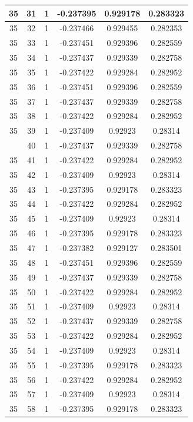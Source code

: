 \documentclass[12pt,a4paper]{article}
\numberwithin{equation}{section}
\numberwithin{figure}{section}
\numberwithin{table}{section}
\begin{document}
\begin{longtable}{|c|c|c|c|c|c|}
35 & 31 & 1 & -0.237395 & 0.929178 & 0.283323 \\ \hline
35 & 32 & 1 & -0.237466 & 0.929455 & 0.282353 \\ \hline
35 & 33 & 1 & -0.237451 & 0.929396 & 0.282559 \\ \hline
35 & 34 & 1 & -0.237437 & 0.929339 & 0.282758 \\ \hline
35 & 35 & 1 & -0.237422 & 0.929284 & 0.282952 \\ \hline
35 & 36 & 1 & -0.237451 & 0.929396 & 0.282559 \\ \hline
35 & 37 & 1 & -0.237437 & 0.929339 & 0.282758 \\ \hline
35 & 38 & 1 & -0.237422 & 0.929284 & 0.282952 \\ \hline
35 & 39 & 1 & -0.237409 & 0.92923 & 0.28314 \\ \hline
\pagebreak
35 & 40 & 1 & -0.237437 & 0.929339 & 0.282758 \\ \hline
35 & 41 & 1 & -0.237422 & 0.929284 & 0.282952 \\ \hline
35 & 42 & 1 & -0.237409 & 0.92923 & 0.28314 \\ \hline
35 & 43 & 1 & -0.237395 & 0.929178 & 0.283323 \\ \hline
35 & 44 & 1 & -0.237422 & 0.929284 & 0.282952 \\ \hline
35 & 45 & 1 & -0.237409 & 0.92923 & 0.28314 \\ \hline
35 & 46 & 1 & -0.237395 & 0.929178 & 0.283323 \\ \hline
35 & 47 & 1 & -0.237382 & 0.929127 & 0.283501 \\ \hline
35 & 48 & 1 & -0.237451 & 0.929396 & 0.282559 \\ \hline
35 & 49 & 1 & -0.237437 & 0.929339 & 0.282758 \\ \hline
35 & 50 & 1 & -0.237422 & 0.929284 & 0.282952 \\ \hline
35 & 51 & 1 & -0.237409 & 0.92923 & 0.28314 \\ \hline
35 & 52 & 1 & -0.237437 & 0.929339 & 0.282758 \\ \hline
35 & 53 & 1 & -0.237422 & 0.929284 & 0.282952 \\ \hline
35 & 54 & 1 & -0.237409 & 0.92923 & 0.28314 \\ \hline
35 & 55 & 1 & -0.237395 & 0.929178 & 0.283323 \\ \hline
35 & 56 & 1 & -0.237422 & 0.929284 & 0.282952 \\ \hline
35 & 57 & 1 & -0.237409 & 0.92923 & 0.28314 \\ \hline
35 & 58 & 1 & -0.237395 & 0.929178 & 0.283323 \\ \hline

\end{longtable}
\end{document}
